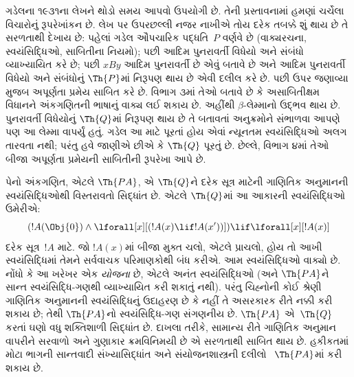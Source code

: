 \begingroup
\makeatletter{}\makeatother


\label{guunit:OLP-0317}


ગડેલના ૧૯૩૧ના લેખને
થોડો સમય આપવો ઉપયોગી છે.
તેની પ્રસ્તાવનામાં હમણાં
ચર્ચેલા વિચારોનું રૂપરેખાંકન
છે. લેખ પર ઉપરછલ્લી
નજર નાખીએ તોય દરેક
તબક્કે શું થાય છે તે
સરળતાથી દેખાય છે:
પહેલાં ગડેલ ઔપચારિક
પદ્ધતિ~$P$ વર્ણવે છે
(વાક્યરચના, સ્વયંસિદ્ધિઓ,
સાબિતીના નિયમો); પછી
આદિમ પુનરાવર્તી વિધેયો
અને સંબંધો વ્યાખ્યાયિત
કરે છે; પછી $x B y$
આદિમ પુનરાવર્તી છે એવું
બતાવે છે અને આદિમ
પુનરાવર્તી વિધેયો અને
સંબંધોનું $\Th{P}$માં
નિરૂપણ થાય છે એવી
દલીલ કરે છે. પછી ઉપર
જણાવ્યા મુજબ અપૂર્ણતા
પ્રમેય સાબિત કરે છે.
વિભાગ ૩માં તેઓ બતાવે છે
કે અસાબિતીક્ષમ વિધાનને
અંકગણિતની ભાષાનું વાક્ય
લઈ શકાય છે. અહીંથી
$\beta$-લેમ્માનો ઉદ્ભવ
થાય છે. પુનરાવર્તી
વિધેયોનું $\Th{Q}$માં
નિરૂપણ થાય છે તે
બતાવતાં અનુક્રમોને
સંભાળવા આપણે પણ આ
લેમ્મા વાપર્યું હતું.
ગડેલ આ માટે પૂરતાં હોય
એવાં ન્યૂનતમ સ્વયંસિદ્ધિઓ
અલગ તારવતા નથી; પરંતુ
હવે જાણીએ છીએ કે
$\Th{Q}$ પૂરતું છે.
છેલ્લે, વિભાગ ૪માં
તેઓ બીજા અપૂર્ણતા
પ્રમેયની સાબિતીની
રૂપરેખા આપે છે.
\endgroup


\begingroup
\makeatletter{}\makeatother


\label{guunit:OLP-0318}


પેનો અંકગણિત, એટલે
$\Th{PA}$, એ
$\Th{Q}$ને દરેક
સૂત્ર માટેની
ગાણિતિક અનુમાનની
સ્વયંસિદ્ધિઓથી વિસ્તરાવતો
સિદ્ધાંત છે. એટલે
$\Th{Q}$માં આ આકારની
સ્વયંસિદ્ધિઓ ઉમેરીએ:
\[
(!A(\Obj{0}) \land \lforall[x][(!A(x) \lif !A(x'))]) \lif \lforall[x][!A(x)]
\]
દરેક સૂત્ર~$!A$
માટે. જો $!A(x)$માં બીજા મુક્ત ચલો, એટલે પ્રાચલો,
હોય તો આખી સ્વયંસિદ્ધિમાં તેમને સર્વવાચક પરિમાણકોથી
બંધ કરીએ. આમ સ્વયંસિદ્ધિઓ વાક્યો છે.
નોંધો કે આ ખરેખર
એક \emph{યોજના} છે,
એટલે અનંત સ્વયંસિદ્ધિઓ
(અને $\Th{PA}$ને સાન્ત
સ્વયંસિદ્ધિ-ગણથી
વ્યાખ્યાયિત કરી શકાતું
નથી). પરંતુ ચિહ્નોની
કોઈ શ્રેણી ગાણિતિક
અનુમાનની સ્વયંસિદ્ધિનું
ઉદાહરણ છે કે નહીં તે
અસરકારક રીતે નક્કી કરી
શકાય છે; તેથી
$\Th{PA}$નો સ્વયંસિદ્ધિ-ગણ
સંગણનીય છે. $\Th{PA}$
એ~$\Th{Q}$ કરતાં ઘણો
વધુ શક્તિશાળી સિદ્ધાંત
છે. દાખલા તરીકે, સામાન્ય
રીતે ગાણિતિક અનુમાન
વાપરીને સરવાળો અને ગુણાકાર
ક્રમવિનિમયી છે એ સરળતાથી
સાબિત થાય છે. હકીકતમાં
મોટા ભાગની સાન્તવાદી
સંખ્યાસિદ્ધાંત અને
સંયોજનશાસ્ત્રની દલીલો
~$\Th{PA}$માં કરી શકાય છે.

